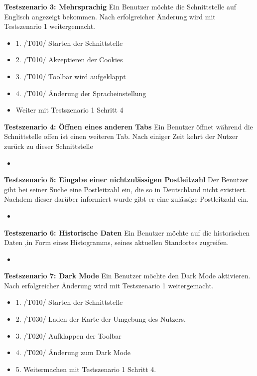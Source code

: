\textbf{Testszenario 3: Mehrsprachig}
\newline
Ein Benutzer möchte die Schnittstelle auf Englisch angezeigt bekommen. Nach erfolgreicher Änderung wird mit Testszenario 1 weitergemacht.
\begin{itemize}
    \item 1. /T010/ Starten der Schnittstelle
    \item 2. /T010/ Akzeptieren der Cookies
    \item 3. /T010/ Toolbar wird aufgeklappt
    \item 4. /T010/ Änderung der Spracheinstellung
    \item Weiter mit Testszenario 1 Schritt 4
\end{itemize}

\textbf{Testszenario 4: Öffnen eines anderen Tabs}
\newline
Ein Benutzer öffnet während die Schnittstelle offen ist einen weiteren Tab. Nach einiger Zeit kehrt der Nutzer zurück zu dieser Schnittstelle
\begin{itemize}
    \item 
\end{itemize}

\textbf{Testszenario 5: Eingabe einer nichtzulässigen Postleitzahl}
\newline
Der Benutzer gibt bei seiner Suche eine Postleitzahl ein, die so in Deutschland nicht existiert. Nachdem dieser darüber informiert wurde gibt er eine zulässige Postleitzahl ein.
\begin{itemize}
    \item 
\end{itemize}

\textbf{Testszenario 6: Historische Daten}
\newline
Ein Benutzer möchte auf die historischen Daten ,in Form eines Histogramms, seines aktuellen Standortes zugreifen.
\begin{itemize}
    \item 
\end{itemize}

\textbf{Testszenario 7: Dark Mode}
\newline
Ein Benutzer möchte den Dark Mode aktivieren. Nach erfolgreicher Änderung wird mit Testszenario 1 weitergemacht.
\begin{itemize}
    \item 1. /T010/ Starten der Schnittstelle
    \item 2. /T030/ Laden der Karte der Umgebung des Nutzers.
    \item 3. /T020/ Aufklappen der Toolbar
    \item 4. /T020/ Änderung zum Dark Mode
    \item 5. Weitermachen mit Testszenario 1 Schritt 4.
\end{itemize}

